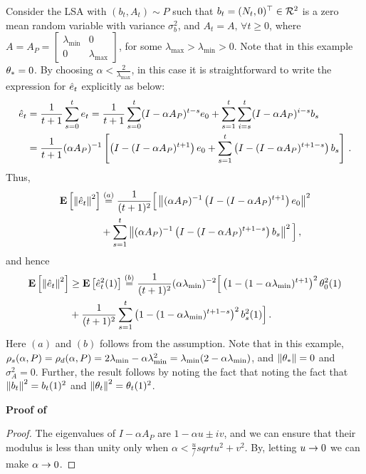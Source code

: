 Consider the LSA with $(b_t,A_t)\sim P$ such that $b_t=(N_t,0)^\top\in\mathcal{R}^2$ is a zero mean \iid random variable with variance $\sigma^2_b$, and $A_t=A,\,\forall t\geq 0$, where $A=A_P=\begin{bmatrix} \lambda_{\min} &0\\ 0& \lambda_{\max}\end{bmatrix}$, for some $\lambda_{\max}>\lambda_{\min}>0$. Note that in this example $\theta_*=0$.
By choosing $\alpha<\frac2{\lambda_{\max}}$, in this case it is straightforward to write the expression for $\hat{e}_t$ explicitly as below:
\begin{align*}
\hat{e}_t&=\frac{1}{t+1}\sum_{s=0}^t e_t = \frac{1}{t+1}\sum_{s=0}^t (I-\alpha A_P)^{t-s} e_0 + \sum_{s=1}^t \sum_{i=s}^t (I-\alpha A_P)^{i-s} b_s\\
&=\frac{1}{t+1}(\alpha A_P)^{-1}\left[\left(I-(I-\alpha A_P)^{t+1}\right)e_0 + \sum_{s=1}^t \left(I-(I-\alpha A_P)^{t+1-s}\right) b_s\right]\,.
\end{align*}
Thus,
\begin{align*}
\mathbf{E}\left[\left\| \hat{e}_t\right\|^2\right]&\stackrel{(a)}{=}\frac{1}{(t+1)^2}\Big[\left\| (\alpha A_P)^{-1}\left(I-(I-\alpha A_P)^{t+1}\right)e_0\right\|^2 \\ 
&+\sum_{s=1}^t \left\| (\alpha A_P)^{-1}\left(I-(I-\alpha A_P)^{t+1-s}\right)b_s\right\|^2\Big]\,,
\end{align*}
and hence
\begin{align*}
\mathbf{E}\left[\left\| \hat{e}_t\right\|^2\right]
& \geq \mathbf{E}\left[\hat{e}^2_t(1)\right]\stackrel{(b)}{=}\frac{1}{(t+1)^2}(\alpha \lambda_{\min})^{-2}\Big[\left(1-(1-\alpha \lambda_{\min})^{t+1}\right)^2 \theta^2_0(1)\\
& + \frac{1}{(t+1)^2}\sum_{s=1}^t\left(1-(1-\alpha \lambda_{\min})^{t+1-s}\right)^2 b^2_s(1) \Big]\,.
\end{align*}
Here $(a)$ and $(b)$ follows from the \iid assumption. Note that in this example, $\rho_s(\alpha,P)=\rho_d(\alpha,P)=2\lambda_{\min} -\alpha \lambda_{\min}^2=\lambda_{\min}(2-\alpha \lambda_{\min})$, and $\left\| \theta_*\right\|=0$ and $\sigma^2_A=0$. Further, the result follows by noting the fact that noting the fact that $\left\| b_t\right\|^2=b_t(1)^2$ and $\left\| \theta_t\right\|^2=\theta_t(1)^2$.


\textbf{Proof of }
\begin{proof}
The eigenvalues of $I-\alpha A_P$ are $1-\alpha u\pm i v$, and we can ensure that their modulus is less than unity only when $\alpha<\frac{u}/sqrt{u^2+v^2}$. By, letting $u\rightarrow 0$ we can make $\alpha\rightarrow 0$.
\end{proof}

